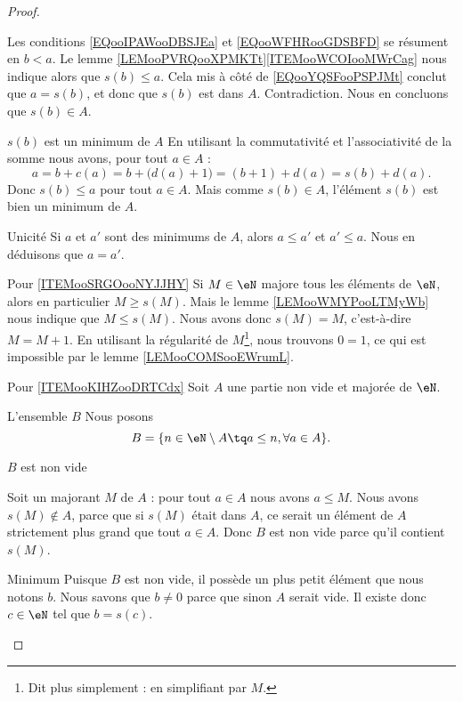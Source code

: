 \begin{proof}
\begin{subproof}
\begin{subproof}
        Les conditions \eqref{EQooIPAWooDBSJEa} et \eqref{EQooWFHRooGDSBFD} se résument en \( b<a\). Le lemme \ref{LEMooPVRQooXPMKTt}\ref{ITEMooWCOIooMWrCag} nous indique alors que \( s(b)\leq a\). Cela mis à côté de \eqref{EQooYQSFooPSPJMt} conclut que \( a=s(b)\), et donc que \( s(b)\) est dans \( A\). Contradiction. Nous en concluons que \( s(b)\in A\).
    \item[\( s(b)\) est un minimum de \( A\)]
        En utilisant la commutativité et l'associativité de la somme nous avons, pour tout \( a\in A\) :
        \begin{equation}
            a=b+c(a)=b+\big( d(a)+1 \big)=(b+1)+d(a)=s(b)+d(a).
        \end{equation}
        Donc \( s(b)\leq a\) pour tout \( a\in A\). Mais comme \( s(b)\in A\), l'élément \( s(b)\) est bien un minimum de \( A\).
    \item[Unicité]
        Si \( a\) et \( a'\) sont des minimums de \( A\), alors \( a\leq a'\) et \( a'\leq a\). Nous en déduisons que \( a=a'\).
        \end{subproof}
    \item[Pour \ref{ITEMooSRGOooNYJJHY}]
        Si \( M\in \eN\) majore tous les éléments de \( \eN\), alors en particulier \( M\geq s(M)\). Mais le lemme \ref{LEMooWMYPooLTMyWb} nous indique que \( M\leq s(M)\). Nous avons donc \( s(M)=M\), c'est-à-dire \( M=M+1\). En utilisant la régularité de \( M\)\footnote{Dit plus simplement : en simplifiant par \( M\).}, nous trouvons $0=1$, ce qui est impossible par le lemme \ref{LEMooCOMSooEWrumL}.
    \item[Pour \ref{ITEMooKIHZooDRTCdx}]
        Soit \( A\) une partie non vide et majorée de \( \eN\). 
        \begin{subproof}
        \item[L'ensemble \( B\)]
        Nous posons
        \begin{equation}
            B=\{ n\in \eN\setminus A\tq a\leq n, \forall a \in A \}.
        \end{equation}
    \item[\( B\) est non vide]
        \end{subproof}
        Soit un majorant \( M\) de \( A\) : pour tout \( a\in A\) nous avons \( a\leq M\). Nous avons \( s(M)\notin A\), parce que si \( s(M)\) était dans \( A\), ce serait un élément de \( A\) strictement plus grand que tout \( a\in A\). Donc \( B\) est non vide parce qu'il contient \( s(M)\).
    \item[Minimum]
        Puisque \( B\) est non vide, il possède un plus petit élément que nous notons \( b\). Nous savons que \( b\neq 0\) parce que sinon \( A\) serait vide. Il existe donc \( c\in \eN\) tel que \( b=s(c)\).


\end{subproof}
\end{proof}
